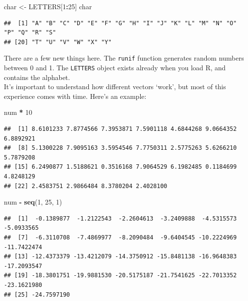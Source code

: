 \documentclass[
]{book}
\newenvironment{Shaded}{\begin{snugshade}}{\end{snugshade}}
\newcommand{\DecValTok}[1]{\textcolor[rgb]{0.00,0.00,0.81}{#1}}
\newcommand{\KeywordTok}[1]{\textcolor[rgb]{0.13,0.29,0.53}{\textbf{#1}}}
\newcommand{\NormalTok}[1]{#1}
\newcommand{\OperatorTok}[1]{\textcolor[rgb]{0.81,0.36,0.00}{\textbf{#1}}}
\newcommand{\StringTok}[1]{\textcolor[rgb]{0.31,0.60,0.02}{#1}}
\begin{document}
\begin{Shaded}
\begin{Highlighting}[]
\NormalTok{char <-}\StringTok{ }\NormalTok{LETTERS[}\DecValTok{1}\OperatorTok{:}\DecValTok{25}\NormalTok{]}
\NormalTok{char}
\end{Highlighting}
\end{Shaded}

\begin{verbatim}
##  [1] "A" "B" "C" "D" "E" "F" "G" "H" "I" "J" "K" "L" "M" "N" "O" "P" "Q" "R" "S"
## [20] "T" "U" "V" "W" "X" "Y"
\end{verbatim}

There are a few new things here. The \texttt{runif} function generates random numbers
between 0 and 1. The \texttt{LETTERS} object exists already when you load R, and
contains the alphabet.\\

It's important to understand how different vectors `work', but most of this
experience comes with time. Here's an example:

\begin{Shaded}
\begin{Highlighting}[]
\NormalTok{num }\OperatorTok{*}\StringTok{ }\DecValTok{10}
\end{Highlighting}
\end{Shaded}

\begin{verbatim}
##  [1] 8.6101233 7.8774566 7.3953871 7.5901118 4.6844268 9.0664352 6.8892921
##  [8] 5.1300228 7.9095163 3.5954546 7.7750311 2.5775263 5.6266210 5.7879208
## [15] 6.2490877 1.5188621 0.3516168 7.9064529 6.1982485 0.1184699 4.8248129
## [22] 2.4583751 2.9866484 8.3780204 2.4028100
\end{verbatim}

\begin{Shaded}
\begin{Highlighting}[]
\NormalTok{num }\OperatorTok{-}\StringTok{ }\KeywordTok{seq}\NormalTok{(}\DecValTok{1}\NormalTok{, }\DecValTok{25}\NormalTok{, }\DecValTok{1}\NormalTok{)}
\end{Highlighting}
\end{Shaded}

\begin{verbatim}
##  [1]  -0.1389877  -1.2122543  -2.2604613  -3.2409888  -4.5315573  -5.0933565
##  [7]  -6.3110708  -7.4869977  -8.2090484  -9.6404545 -10.2224969 -11.7422474
## [13] -12.4373379 -13.4212079 -14.3750912 -15.8481138 -16.9648383 -17.2093547
## [19] -18.3801751 -19.9881530 -20.5175187 -21.7541625 -22.7013352 -23.1621980
## [25] -24.7597190
\end{verbatim}
\end{document}
